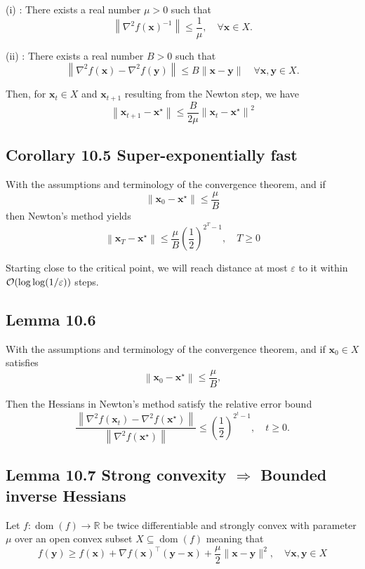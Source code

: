(i) : There exists a real number $\mu>0$ such that
$$
\left\|\nabla^{2} f(\mathbf{x})^{-1}\right\| \leq \frac{1}{\mu}, \quad \forall \mathbf{x} \in X .
$$

(ii) : There exists a real number $B>0$ such that
$$
\left\|\nabla^{2} f(\mathbf{x})-\nabla^{2} f(\mathbf{y})\right\| \leq B\|\mathbf{x}-\mathbf{y}\| \quad \forall \mathbf{x}, \mathbf{y} \in X .
$$

Then, for $\mathbf{x}_{t} \in X$ and $\mathbf{x}_{t+1}$ resulting from the Newton step, we have
$$
\left\|\mathbf{x}_{t+1}-\mathbf{x}^{\star}\right\| \leq \frac{B}{2 \mu}\left\|\mathbf{x}_{t}-\mathbf{x}^{\star}\right\|^{2}
$$






\subsection*{Corollary 10.5 Super-exponentially fast}
With the assumptions and terminology of the convergence theorem, and if
$$
\left\|\mathbf{x}_{0}-\mathbf{x}^{\star}\right\| \leq \frac{\mu}{B}
$$
then Newton's method yields
$$
\left\|\mathbf{x}_{T}-\mathbf{x}^{\star}\right\| \leq \frac{\mu}{B}\left(\frac{1}{2}\right)^{2^{T}-1}, \quad T \geq 0
$$

Starting close to the critical point, we will reach distance at most $\varepsilon$ to it within $\mathcal{\operatorname{\mathcal{O}}}(\log \log (1 / \varepsilon))$ steps.









\subsection*{Lemma 10.6}
With the assumptions and terminology of the convergence theorem, and if $\mathbf{x}_{0} \in X$ satisfies
$$
\left\|\mathbf{x}_{0}-\mathbf{x}^{\star}\right\| \leq \frac{\mu}{B},
$$

Then the Hessians in Newton's method satisfy the relative error bound
$$
\frac{\left\|\nabla^{2} f\left(\mathbf{x}_{t}\right)-\nabla^{2} f\left(\mathbf{x}^{\star}\right)\right\|}{\left\|\nabla^{2} f\left(\mathbf{x}^{\star}\right)\right\|} \leq\left(\frac{1}{2}\right)^{2^{t}-1}, \quad t \geq 0 .
$$





\subsection*{Lemma 10.7 Strong convexity $\Rightarrow$ Bounded inverse Hessians}
Let $f: \operatorname{dom}(f) \rightarrow \mathbb{R}$ be twice differentiable and strongly convex with parameter $\mu$ over an open convex subset $X \subseteq \operatorname{dom}(f)$ meaning that
$$
f(\mathbf{y}) \geq f(\mathbf{x})+\nabla f(\mathbf{x})^{\top}(\mathbf{y}-\mathbf{x})+\frac{\mu}{2}\|\mathbf{x}-\mathbf{y}\|^{2}, \quad \forall \mathbf{x}, \mathbf{y} \in X
$$

